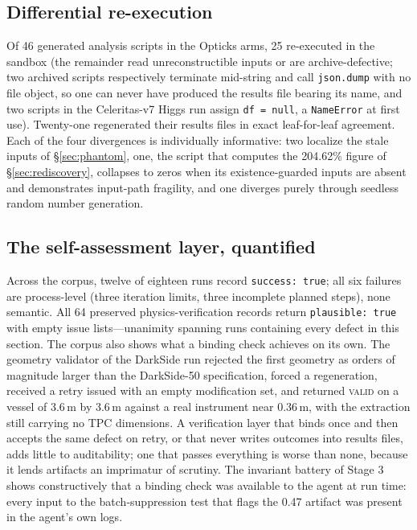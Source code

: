 \documentclass{article}
\begin{document}
\subsection{Differential re-execution}

Of 46 generated analysis scripts in the Opticks arms, 25 re-executed in the sandbox (the remainder read unreconstructible inputs or are archive-defective; two archived scripts respectively terminate mid-string and call \texttt{json.dump} with no file object, so one can never have produced the results file bearing its name, and two scripts in the Celeritas-v7 Higgs run assign \texttt{df = null}, a \texttt{NameError} at first use). Twenty-one regenerated their results files in exact leaf-for-leaf agreement. Each of the four divergences is individually informative: two localize the stale inputs of \S\ref{sec:phantom}, one, the script that computes the 204.62\% figure of \S\ref{sec:rediscovery}, collapses to zeros when its existence-guarded inputs are absent and demonstrates input-path fragility, and one diverges purely through seedless random number generation.

\subsection{The self-assessment layer, quantified}

Across the corpus, twelve of eighteen runs record \texttt{success: true}; all six failures are process-level (three iteration limits, three incomplete planned steps), none semantic. All 64 preserved physics-verification records return \texttt{plausible: true} with empty issue lists---unanimity spanning runs containing every defect in this section. The corpus also shows what a binding check achieves on its own. The geometry validator of the DarkSide run rejected the first geometry as orders of magnitude larger than the DarkSide-50 specification, forced a regeneration, received a retry issued with an empty modification set, and returned \textsc{valid} on a vessel of 3.6\,m by 3.6\,m against a real instrument near 0.36\,m, with the extraction still carrying no TPC dimensions. A verification layer that binds once and then accepts the same defect on retry, or that never writes outcomes into results files, adds little to auditability; one that passes everything is worse than none, because it lends artifacts an imprimatur of scrutiny. The invariant battery of Stage 3 shows constructively that a binding check was available to the agent at run time: every input to the batch-suppression test that flags the 0.47 artifact was present in the agent's own logs.
\end{document}
